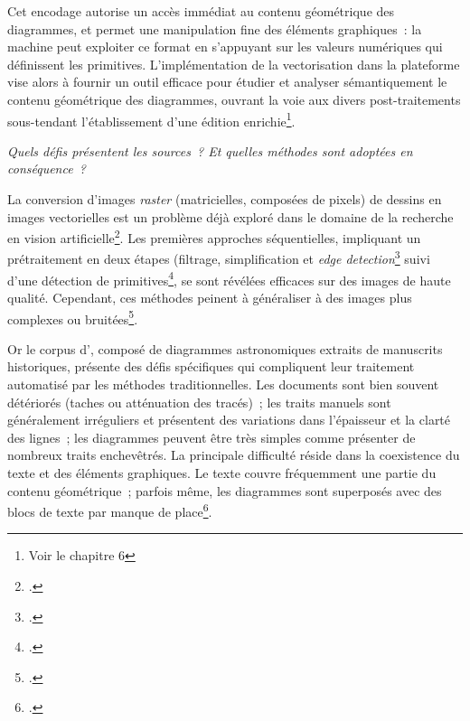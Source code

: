 Cet encodage autorise un accès immédiat au contenu géométrique des
diagrammes, et permet une manipulation fine des éléments graphiques~: la
machine peut exploiter ce format en s'appuyant sur les valeurs
numériques qui définissent les primitives. L'implémentation de la
vectorisation dans la plateforme vise alors à fournir un outil efficace
pour étudier et analyser sémantiquement le contenu géométrique des
diagrammes, ouvrant la voie aux divers post-traitements sous-tendant
l'établissement d'une édition enrichie\footnote{Voir le \hypertarget{chapitre-6-vers-edition}{chapitre 6}}.

\emph{Quels défis présentent les sources~? Et quelles méthodes sont
adoptées en conséquence~?}

La conversion d'images \textit{raster} (matricielles, composées de pixels) de
dessins en images vectorielles est un problème déjà exploré dans le
domaine de la recherche en vision artificielle\footcite{egiazarian_deep_2020}. Les
premières approches séquentielles, impliquant un prétraitement en deux
étapes (filtrage, simplification et \emph{edge detection}\footcite{canny_computational_1986} suivi d'une
détection de primitives\footcite{ref-noauthor_ransac_nodate}, se sont
révélées efficaces sur des images de haute qualité. Cependant, ces
méthodes peinent à généraliser à des images plus complexes ou
bruitées\footcite{hilaire_robust_2006}.

Or le corpus d'\eida, composé de diagrammes astronomiques extraits de
manuscrits historiques, présente des défis spécifiques qui compliquent
leur traitement automatisé par les méthodes traditionnelles. Les
documents sont bien souvent détériorés (taches ou atténuation des
tracés)~; les traits manuels sont généralement irréguliers et présentent
des variations dans l'épaisseur et la clarté des lignes~; les diagrammes
peuvent être très simples comme présenter de nombreux traits
enchevêtrés. La principale difficulté réside dans la coexistence du
texte et des éléments graphiques. Le texte couvre fréquemment une partie
du contenu géométrique~; parfois même, les diagrammes sont superposés
avec des blocs de texte par manque de place\footcite{kalleli_historical_2024}.

